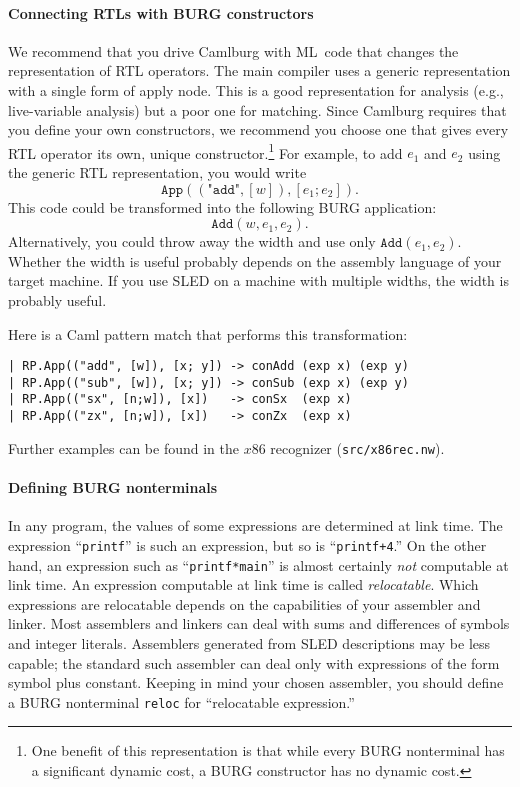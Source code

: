 \documentclass[12pt]{article}
\begin{document}
\paragraph{Connecting RTLs with BURG constructors}

We recommend that you drive Camlburg with ML~code that changes
the representation of RTL operators.
The main compiler uses a generic representation with a single form of
apply node.
This is a good representation for analysis (e.g., live-variable
analysis) but a poor one for matching.
Since Camlburg requires that you define your own constructors, we
recommend you choose one that gives every RTL operator its own, unique
constructor.\footnote
{One benefit of this representation is that while every BURG
nonterminal has a significant dynamic cost, a BURG constructor has no
dynamic cost.}
For example, to add $e_1$ and $e_2$ using the generic RTL
representation, you would write
$$\texttt{App}((\texttt{"add"}, [w]), [e_1; e_2]).$$
This code could be transformed into the following BURG application:
$$\texttt{Add}(w, e_1, e_2).$$
Alternatively, you could throw away the width and use only 
$\texttt{Add}(e_1, e_2)$.
Whether the width is useful probably depends on the assembly language
of your target machine.
If you use SLED on a machine with multiple widths, the width is
probably useful.

Here is a Caml pattern match that performs this transformation:
\begin{verbatim}
| RP.App(("add", [w]), [x; y]) -> conAdd (exp x) (exp y)
| RP.App(("sub", [w]), [x; y]) -> conSub (exp x) (exp y)
| RP.App(("sx", [n;w]), [x])   -> conSx  (exp x)
| RP.App(("zx", [n;w]), [x])   -> conZx  (exp x)
\end{verbatim}
Further examples can be found in the $x$86 recognizer (\texttt{src/x86rec.nw}).


\paragraph{Defining BURG nonterminals}

In any program, the values of some expressions are determined at link
time.
The expression ``\texttt{printf}'' is such an expression, but so is
``\texttt{printf+4}.'' 
On the other hand, an expression such as ``\texttt{printf*main}'' is
almost certainly \emph{not} computable at link time.
An expression computable at link time is called \emph{relocatable}.
Which expressions are relocatable depends on the capabilities of your
assembler and linker.
Most assemblers and linkers can deal with sums and differences of
symbols and integer literals.
Assemblers generated from SLED descriptions may be less capable; the
standard such assembler can deal only with expressions of the form
symbol plus constant.
Keeping in mind
your chosen assembler, you should define a BURG nonterminal
\texttt{reloc} for
``relocatable expression.''
\end{document}
